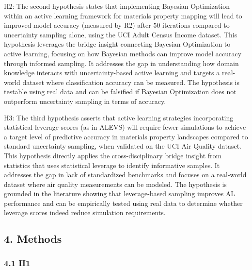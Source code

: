 H2: The second hypothesis states that implementing Bayesian Optimization within an active learning framework for materials property mapping will lead to improved model accuracy (measured by R2) after 50 iterations compared to uncertainty sampling alone, using the UCI Adult Census Income dataset. This hypothesis leverages the bridge insight connecting Bayesian Optimization to active learning, focusing on how Bayesian methods can improve model accuracy through informed sampling. It addresses the gap in understanding how domain knowledge interacts with uncertainty-based active learning and targets a real-world dataset where classification accuracy can be measured. The hypothesis is testable using real data and can be falsified if Bayesian Optimization does not outperform uncertainty sampling in terms of accuracy.

H3: The third hypothesis asserts that active learning strategies incorporating statistical leverage scores (as in ALEVS) will require fewer simulations to achieve a target level of predictive accuracy in materials property landscapes compared to standard uncertainty sampling, when validated on the UCI Air Quality dataset. This hypothesis directly applies the cross-disciplinary bridge insight from statistics that uses statistical leverage to identify informative samples. It addresses the gap in lack of standardized benchmarks and focuses on a real-world dataset where air quality measurements can be modeled. The hypothesis is grounded in the literature showing that leverage-based sampling improves AL performance and can be empirically tested using real data to determine whether leverage scores indeed reduce simulation requirements.

\subsection*{4. Methods}

\subsubsection*{4.1 H1}

